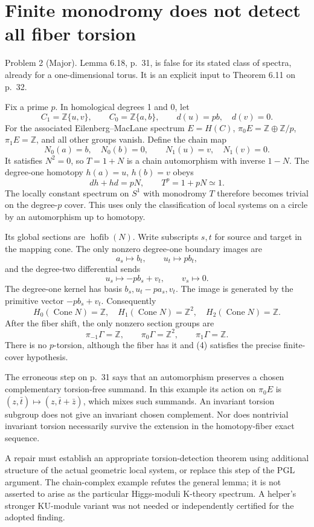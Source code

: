 \documentclass[10pt]{article}
\begin{document}
\section*{Finite monodromy does not detect all fiber torsion}
Problem 2 (Major).  Lemma 6.18, p. 31, is false for its stated class of spectra, already for a one-dimensional torus. It is an explicit input to Theorem 6.11 on p. 32.\par
Fix a prime \(p\). In homological degrees 1 and 0, let \[C_1=\mathbb Z\{u,v\},\qquad C_0=\mathbb Z\{a,b\},\qquad
 d(u)=pb,\quad d(v)=0.\] For the associated Eilenberg–MacLane spectrum \(E=H(C)\), \(\pi_0E=\mathbb Z\oplus\mathbb Z/p\), \(\pi_1E=\mathbb Z\), and all other groups vanish. Define the chain map \[N_0(a)=b,\quad N_0(b)=0,\qquad N_1(u)=v,\quad N_1(v)=0.\] It satisfies \(N^2=0\), so \(T=1+N\) is a chain automorphism with inverse \(1-N\). The degree-one homotopy \(h(a)=u\), \(h(b)=v\) obeys \[dh+hd=pN,\qquad T^p=1+pN\simeq1.                       \tag{4}\] The locally constant spectrum on \(S^1\) with monodromy \(T\) therefore becomes trivial on the degree-\(p\) cover. This uses only the classification of local systems on a circle by an automorphism up to homotopy.\par
Its global sections are \(\operatorname{hofib}(N)\). Write subscripts \(s,t\) for source and target in the mapping cone. The only nonzero degree-one boundary images are \[a_s\longmapsto b_t,\qquad u_t\longmapsto pb_t,\] and the degree-two differential sends \[u_s\longmapsto-pb_s+v_t,\qquad v_s\longmapsto0.\] The degree-one kernel has basis \(b_s,u_t-pa_s,v_t\). The image is generated by the primitive vector \(-pb_s+v_t\). Consequently \[H_0(\operatorname{Cone}N)=\mathbb Z,\quad
 H_1(\operatorname{Cone}N)=\mathbb Z^2,\quad
 H_2(\operatorname{Cone}N)=\mathbb Z.\] After the fiber shift, the only nonzero section groups are \[\pi_{-1}\Gamma=\mathbb Z,\qquad\pi_0\Gamma=\mathbb Z^2,\qquad
 \pi_1\Gamma=\mathbb Z.                                       \tag{5}\] There is no \(p\)-torsion, although the fiber has it and (4) satisfies the precise finite-cover hypothesis.\par
The erroneous step on p. 31 says that an automorphism preserves a chosen complementary torsion-free summand. In this example its action on \(\pi_0E\) is \((z,\bar t)\mapsto(z,\bar t+\bar z)\), which mixes such summands. An invariant torsion subgroup does not give an invariant chosen complement. Nor does nontrivial invariant torsion necessarily survive the extension in the homotopy-fiber exact sequence.\par
A repair must establish an appropriate torsion-detection theorem using additional structure of the actual geometric local system, or replace this step of the PGL argument. The chain-complex example refutes the general lemma; it is not asserted to arise as the particular Higgs-moduli K-theory spectrum. A helper’s stronger KU-module variant was not needed or independently certified for the adopted finding.\par
\end{document}
